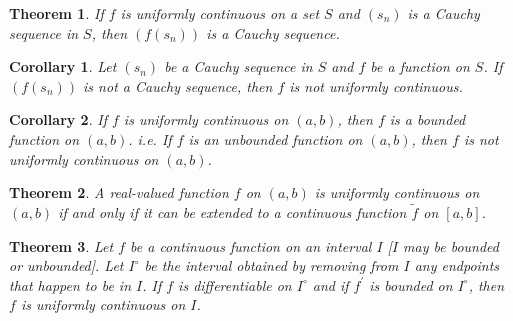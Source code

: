 \documentclass[12pt, lettersize]{book}
\theoremstyle{plain}
\newtheorem{thm}{Theorem}[section]
\newtheorem{cor}{Corollary}[thm]
\theoremstyle{definition}
\theoremstyle{remark}
\begin{document}
		\begin{thm}\label{thm:19.4}
			If $f$ is uniformly continuous on a set $S$ and $(s_n)$ is a Cauchy sequence in $S$, then $(f(s_n))$ is a 
			Cauchy sequence.
		\end{thm}
		\begin{cor}
			Let $(s_n)$ be a Cauchy sequence in $S$ and $f$ be a function on $S$. If $(f(s_n))$ is not a Cauchy sequence, then $f$ is not \emph{uniformly continuous}.
		\end{cor}
		\begin{cor}
			If $f$ is uniformly continuous on $(a,b)$, then $f$ is a bounded function on $(a,b)$. i.e. If $f$ is an unbounded function on $(a,b)$, then $f$ is not uniformly continuous on $(a,b)$.
		\end{cor}
	
		\setcounter{equation}{0}
		\begin{thm}\label{def:19.5}
			A real-valued function $f$ on $(a,b)$ is uniformly continuous on $(a,b)$ if and only if it can be extended to
			a continuous function $\tilde{f}$ on $[a,b]$.
		\end{thm}
		
		\begin{thm}
			Let $f$ be a continuous function on an interval $I$ [$I$ may be bounded or unbounded]. Let $I^\circ$ be the
			interval obtained by removing from $I$ any endpoints that happen to be in $I$. If $f$ is differentiable on
			$I^\circ$ and if $f^\prime$ is bounded on $I^\circ$, then $f$ is uniformly continuous on $I$.
		\end{thm}
		\newpage
	
\end{document}
